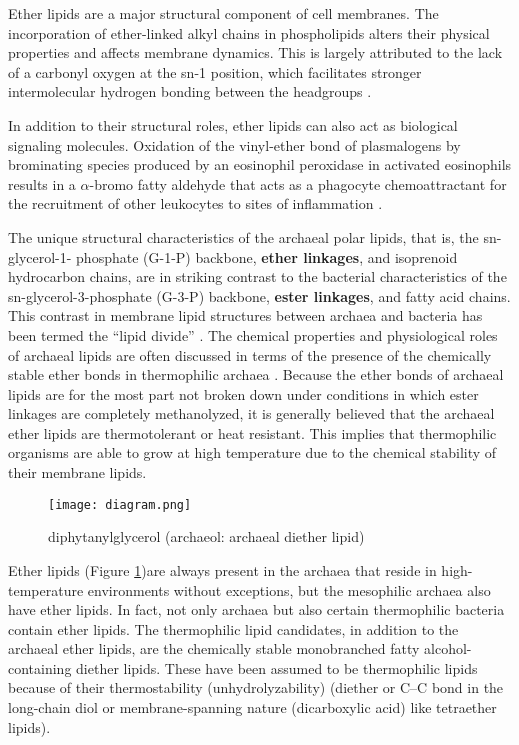 \documentclass[11pt]{scrartcl}
\begin{document}
		Ether lipids are a major structural component of cell membranes. The incorporation of ether-linked alkyl chains in phospholipids alters their physical properties and affects membrane dynamics. This is largely attributed to the lack of a carbonyl oxygen at the sn-1 position, which facilitates stronger intermolecular hydrogen bonding between the headgroups \cite{Lohner}.
		
		In addition to their structural roles, ether lipids can also act as biological signaling molecules. Oxidation of the vinyl-ether bond of plasmalogens by brominating species produced by an eosinophil peroxidase in activated eosinophils results in a $\alpha$-bromo fatty aldehyde that acts as a phagocyte chemoattractant for the recruitment of other leukocytes to sites of inflammation \cite{Thukkani} \cite{Albert}.
		
		The unique structural characteristics of the archaeal polar lipids, that is, the sn-glycerol-1- phosphate (G-1-P) backbone, \textbf{ether linkages}, and isoprenoid hydrocarbon chains, are in striking contrast to the bacterial characteristics of the sn-glycerol-3-phosphate (G-3-P) backbone, \textbf{ester linkages}, and fatty acid chains. This contrast in membrane lipid structures between archaea and bacteria has been termed the “lipid divide” \cite{Koga}. The chemical properties and physiological roles of archaeal lipids are often discussed in terms of the presence of the chemically stable ether bonds in thermophilic archaea \cite{Nakamo}. Because the ether bonds of archaeal lipids are for the most part not broken down under conditions in which ester linkages are completely methanolyzed, it is generally believed that the archaeal ether lipids are thermotolerant or heat resistant. This implies that thermophilic organisms are able to grow at high temperature due to the chemical stability of their membrane lipids.
		
		\begin{figure}[H]
			\centering
			\texttt{[image: diagram.png]}
			\caption{diphytanylglycerol (archaeol: archaeal diether lipid)}
			\label{figure:diagram1}
		\end{figure}
	
		Ether lipids (Figure \ref{figure:diagram1})are always present in the archaea that reside in high-temperature environments without exceptions, but the mesophilic archaea also have ether lipids. In fact, not only archaea but also certain thermophilic bacteria contain ether lipids. The thermophilic lipid candidates, in addition to the archaeal ether lipids, are the chemically stable monobranched fatty alcohol-containing diether lipids. These have been assumed to be thermophilic lipids because of their thermostability (unhydrolyzability) (diether or C–C bond in the long-chain diol or membrane-spanning nature (dicarboxylic acid) like tetraether lipids). 
		
\end{document}
